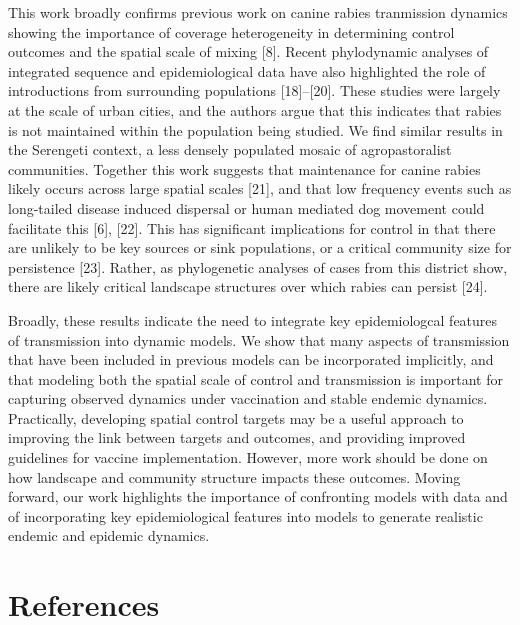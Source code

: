 \documentclass[
]{book}
\begin{document}
This work broadly confirms previous work on canine rabies tranmission dynamics showing the importance of coverage heterogeneity in determining control outcomes and the spatial scale of mixing {[}8{]}. Recent phylodynamic analyses of integrated sequence and epidemiological data have also highlighted the role of introductions from surrounding populations {[}18{]}--{[}20{]}. These studies were largely at the scale of urban cities, and the authors argue that this indicates that rabies is not maintained within the population being studied. We find similar results in the Serengeti context, a less densely populated mosaic of agropastoralist communities. Together this work suggests that maintenance for canine rabies likely occurs across large spatial scales {[}21{]}, and that low frequency events such as long-tailed disease induced dispersal or human mediated dog movement could facilitate this {[}6{]}, {[}22{]}. This has significant implications for control in that there are unlikely to be key sources or sink populations, or a critical community size for persistence {[}23{]}. Rather, as phylogenetic analyses of cases from this district show, there are likely critical landscape structures over which rabies can persist {[}24{]}.

Broadly, these results indicate the need to integrate key epidemiologcal features of transmission into dynamic models. We show that many aspects of transmission that have been included in previous models can be incorporated implicitly, and that modeling both the spatial scale of control and transmission is important for capturing observed dynamics under vaccination and stable endemic dynamics. Practically, developing spatial control targets may be a useful approach to improving the link between targets and outcomes, and providing improved guidelines for vaccine implementation. However, more work should be done on how landscape and community structure impacts these outcomes. Moving forward, our work highlights the importance of confronting models with data and of incorporating key epidemiological features into models to generate realistic endemic and epidemic dynamics.

\hypertarget{references-4}{%
\section{References}\label{references-4}}
\end{document}
